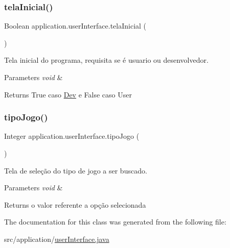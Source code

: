\subsubsection{\texorpdfstring{telaInicial()}{telaInicial()}}
{\footnotesize\ttfamily Boolean application.\+user\+Interface.\+tela\+Inicial (\begin{DoxyParamCaption}{ }\end{DoxyParamCaption})}



Tela inicial do programa, requisita se é usuario ou desenvolvedor. 


\begin{DoxyParams}{Parameters}
{\em void} & \\
\hline
\end{DoxyParams}
\begin{DoxyReturn}{Returns}
True caso \mbox{\hyperlink{classapplication_1_1_dev}{Dev}} e False caso User 
\end{DoxyReturn}
\mbox{\label{classapplication_1_1user_interface_aa764b8abf20ccd252d8a7afaf7d68644}} 
\subsubsection{\texorpdfstring{tipoJogo()}{tipoJogo()}}
{\footnotesize\ttfamily Integer application.\+user\+Interface.\+tipo\+Jogo (\begin{DoxyParamCaption}{ }\end{DoxyParamCaption})}



Tela de seleção do tipo de jogo a ser buscado. 


\begin{DoxyParams}{Parameters}
{\em void} & \\
\hline
\end{DoxyParams}
\begin{DoxyReturn}{Returns}
o valor referente a opção selecionada 
\end{DoxyReturn}


The documentation for this class was generated from the following file\+:\begin{DoxyCompactItemize}
\item 
src/application/\mbox{\hyperlink{user_interface_8java}{user\+Interface.\+java}}\end{DoxyCompactItemize}
